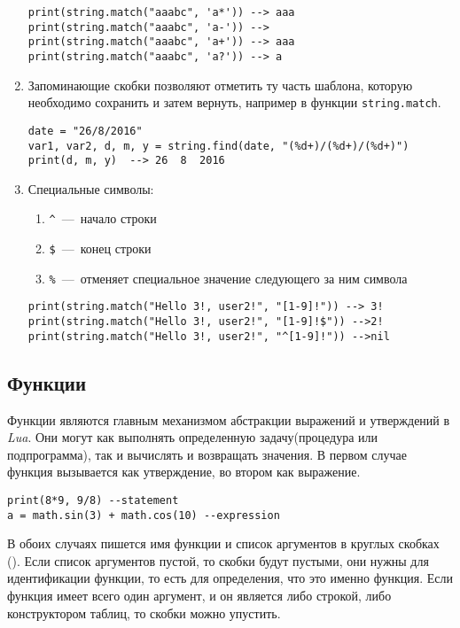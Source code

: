 \begin{enumerate}
\begin{lstlisting}
print(string.match("aaabc", 'a*')) --> aaa
print(string.match("aaabc", 'a-')) --> 
print(string.match("aaabc", 'a+')) --> aaa
print(string.match("aaabc", 'a?')) --> a
\end{lstlisting}
	
	\item Запоминающие скобки позволяют отметить ту часть шаблона, которую необходимо сохранить и затем вернуть, например в функции \lstinline{string.match}.

\begin{lstlisting}
date = "26/8/2016"
var1, var2, d, m, y = string.find(date, "(%d+)/(%d+)/(%d+)")
print(d, m, y)  --> 26  8  2016
\end{lstlisting}

	\item Специальные символы:
			\begin{enumerate}
				\item \lstinline{^}~---~начало строки
				\item \lstinline{$}~---~конец строки
				\item \lstinline{%}~---~отменяет специальное значение следующего за ним символа
			\end{enumerate}

\begin{lstlisting}
print(string.match("Hello 3!, user2!", "[1-9]!")) --> 3!
print(string.match("Hello 3!, user2!", "[1-9]!$")) -->2!
print(string.match("Hello 3!, user2!", "^[1-9]!")) -->nil
\end{lstlisting}

\end{enumerate}

\subsection{Функции}
Функции являются главным механизмом абстракции выражений и утверждений в \emph{Lua}. Они могут как выполнять определенную задачу(процедура или подпрограмма), так и вычислять и возвращать значения. В первом случае функция вызывается как утверждение, во втором как выражение. 

\begin{lstlisting}
print(8*9, 9/8) --statement
a = math.sin(3) + math.cos(10) --expression
\end{lstlisting}

В обоих случаях пишется имя функции и список аргументов в круглых скобках (). Если список аргументов пустой, то скобки будут пустыми, они нужны для идентификации функции, то есть для определения, что это именно функция. Если функция имеет всего один аргумент, и он является либо строкой, либо конструктором таблиц, то скобки можно упустить.

